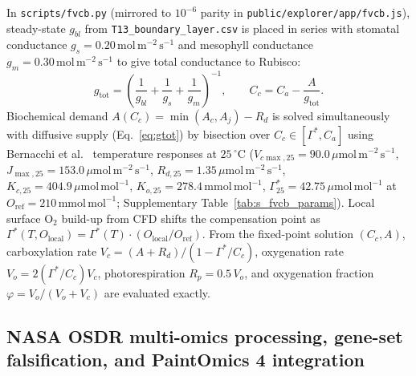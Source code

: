 \documentclass[preprint,11pt,numbers,sort&compress]{elsarticle}
\newcommand{\ums}{\ensuremath{\mu\mathrm{mol\,m^{-2}\,s^{-1}}}}
\newcommand{\molms}{\ensuremath{\mathrm{mol\,m^{-2}\,s^{-1}}}}
\begin{document}
In \texttt{scripts/fvcb.py} (mirrored to $10^{-6}$ parity in \texttt{public/explorer/app/fvcb.js}), steady-state $g_{bl}$ from \texttt{T13\_boundary\_layer.csv} is placed in series with stomatal conductance $g_s = 0.20\,\molms$ and mesophyll conductance $g_m = 0.30\,\molms$ to give total conductance to Rubisco:
\begin{equation}
g_{\mathrm{tot}} = \left(\frac{1}{g_{bl}} + \frac{1}{g_s} + \frac{1}{g_m}\right)^{-1}, \qquad C_c = C_a - \frac{A}{g_{\mathrm{tot}}}.
\label{eq:gtot}
\end{equation}
Biochemical demand $A(C_c) = \min(A_c, A_j) - R_d$ is solved simultaneously with diffusive supply (Eq.~\ref{eq:gtot}) by bisection over $C_c \in [\Gamma^*, C_a]$ using Bernacchi et al.~\citep{bernacchi2001,bernacchi2003} temperature responses at $25\,^\circ\mathrm{C}$ ($V_{c\max,25} = 90.0\,\ums$, $J_{\max,25} = 153.0\,\ums$, $R_{d,25} = 1.35\,\ums$, $K_{c,25} = 404.9\,\mu\mathrm{mol\,mol^{-1}}$, $K_{o,25} = 278.4\,\mathrm{mmol\,mol^{-1}}$, $\Gamma^*_{25} = 42.75\,\mu\mathrm{mol\,mol^{-1}}$ at $O_{\mathrm{ref}} = 210\,\mathrm{mmol\,mol^{-1}}$; Supplementary Table~\ref{tab:s_fvcb_params}). Local surface $\mathrm{O_2}$ build-up from CFD shifts the compensation point as $\Gamma^*(T, O_{\mathrm{local}}) = \Gamma^*(T)\cdot(O_{\mathrm{local}}/O_{\mathrm{ref}})$. From the fixed-point solution $(C_c, A)$, carboxylation rate $V_c = (A + R_d)/(1 - \Gamma^*/C_c)$, oxygenation rate $V_o = 2(\Gamma^*/C_c)V_c$, photorespiration $R_p = 0.5\,V_o$, and oxygenation fraction $\varphi = V_o/(V_o+V_c)$ are evaluated exactly.

\subsection{NASA OSDR multi-omics processing, gene-set falsification, and PaintOmics 4 integration}
\end{document}
